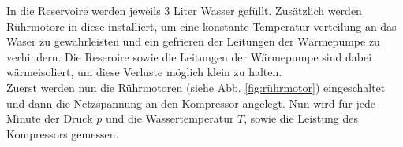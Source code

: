 In die Reservoire werden jeweils 3 Liter Wasser gefüllt. Zusätzlich werden
Rührmotore in diese installiert, um eine konstante Temperatur verteilung an 
das Waser zu gewährleisten und ein gefrieren der Leitungen der Wärmepumpe zu verhindern.
Die Reseroire sowie die Leitungen der Wärmepumpe sind dabei wärmeisoliert,
um diese Verluste möglich klein zu halten.\\

Zuerst werden nun die Rührmotoren (siehe Abb. \ref{fig:rührmotor}) eingeschaltet und dann die Netzspannung
an den Kompressor angelegt.
Nun wird für jede Minute der Druck $p$ und die Wassertemperatur $T$, sowie die 
Leistung des Kompressors gemessen.\\
